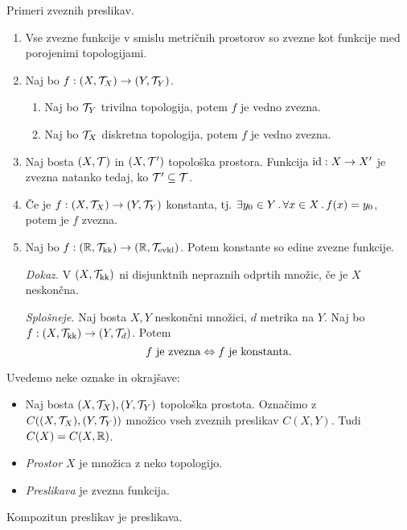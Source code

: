 \begin{primer}
    Primeri zveznih preslikav.
    \begin{enumerate}
        \item Vse zvezne funkcije v smislu metričnih prostorov so zvezne kot funkcije med porojenimi topologijami.
        \item Naj bo $f: (X, \mathcal{T}_X) \to (Y, \mathcal{T}_Y)$. 
        \begin{enumerate}
            \item Naj bo $\mathcal{T}_Y$ trivilna topologija, potem $f$ je vedno zvezna.
            \item Naj bo $\mathcal{T}_X$ diskretna topologija, potem $f$ je vedno zvezna.
        \end{enumerate}
        \item Naj bosta $(X, \mathcal{T})$ in $(X, \mathcal{T}')$ topološka prostora. Funkcija $\operatorname{id}: X \to X'$ je zvezna natanko tedaj, ko $\mathcal{T}' \subseteq \mathcal{T}$.
        \item Če je $f: (X, \mathcal{T}_X) \to (Y, \mathcal{T}_Y)$ konstanta, tj. $\exists y_0 \in Y \,.\, \forall x \in X \,.\, f(x) = y_0$, potem je $f$ zvezna.
        \item Naj bo $f: (\mathbb{R}, \mathcal{T}_{\text{kk}}) \to (\mathbb{R}, \mathcal{T}_{\text{evkl}})$. Potem konstante so edine zvezne funkcije. 
        
        \emph{Dokaz.} V $(X, \mathcal{T}_{\text{kk}})$ ni disjunktnih nepraznih odprtih množic, če je $X$ neskončna.
        
        \emph{Splošneje.} Naj bosta $X, Y$ neskončni množici, $d$ metrika na $Y$. Naj bo $f: (X, \mathcal{T}_{\text{kk}}) \to (Y, \mathcal{T}_d)$. Potem 
        $$f \text{ je zvezna} \Leftrightarrow f \text{ je konstanta}.$$
    \end{enumerate}
\end{primer}

Uvedemo neke oznake in okrajšave:
\begin{itemize}
    \item Naj bosta $(X, \mathcal{T}_X), (Y, \mathcal{T}_Y)$ topološka prostota. Označimo z $C((X, \mathcal{T}_X), (Y, \mathcal{T}_Y))$ množico vseh zveznih preslikav $C(X, Y)$. Tudi $C(X) = C(X, \mathbb{R})$.
    \item \emph{Prostor $X$} je množica z neko topologijo.
    \item \emph{Preslikava} je zvezna funkcija.
\end{itemize}

\begin{trditev}
    Kompozitun preslikav je preslikava.
\end{trditev}

